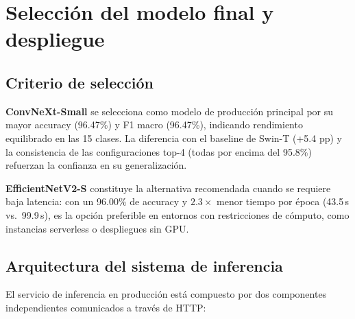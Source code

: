 \section{Selección del modelo final y despliegue}

\subsection{Criterio de selección}

\textbf{ConvNeXt-Small} se selecciona como modelo de producción principal por su mayor accuracy (96.47\%) y F1 macro (96.47\%), indicando rendimiento equilibrado en las 15 clases. La diferencia con el baseline de Swin-T (+5.4 pp) y la consistencia de las configuraciones top-4 (todas por encima del 95.8\%) refuerzan la confianza en su generalización.

\textbf{EfficientNetV2-S} constituye la alternativa recomendada cuando se requiere baja latencia: con un 96.00\% de accuracy y $2.3\times$ menor tiempo por época (43.5\,s vs.\ 99.9\,s), es la opción preferible en entornos con restricciones de cómputo, como instancias serverless o despliegues sin GPU.

\subsection{Arquitectura del sistema de inferencia}

El servicio de inferencia en producción está compuesto por dos componentes independientes comunicados a través de HTTP:

